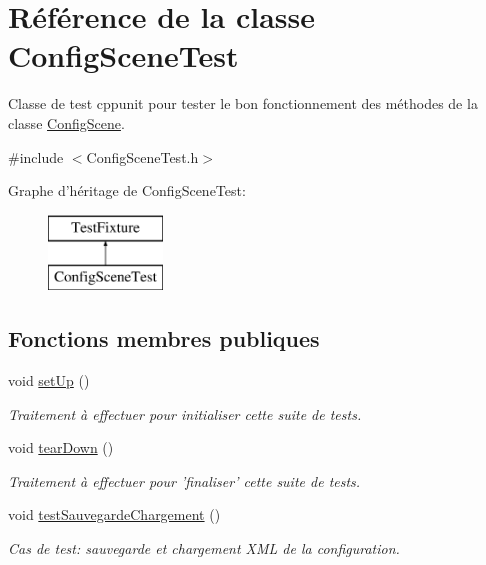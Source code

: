 \hypertarget{class_config_scene_test}{\section{Référence de la classe Config\-Scene\-Test}
\label{class_config_scene_test}
}


Classe de test cppunit pour tester le bon fonctionnement des méthodes de la classe \hyperlink{class_config_scene}{Config\-Scene}.  




{\ttfamily \#include $<$Config\-Scene\-Test.\-h$>$}

Graphe d'héritage de Config\-Scene\-Test\-:\begin{figure}[H]
\begin{center}
\leavevmode
\includegraphics[height=2.000000cm]{class_config_scene_test}
\end{center}
\end{figure}
\subsection*{Fonctions membres publiques}
\begin{DoxyCompactItemize}
\item 
void \hyperlink{group__inf2990_ga707d7400843047e67b736ab79bafb5a0}{set\-Up} ()
\begin{DoxyCompactList}\small\item\em Traitement à effectuer pour initialiser cette suite de tests. \end{DoxyCompactList}\item 
void \hyperlink{group__inf2990_ga889ed3891c3e55280cabb982953906d9}{tear\-Down} ()
\begin{DoxyCompactList}\small\item\em Traitement à effectuer pour 'finaliser' cette suite de tests. \end{DoxyCompactList}\item 
void \hyperlink{group__inf2990_ga0f09d52bc30d87f18b0341e1052efb74}{test\-Sauvegarde\-Chargement} ()
\begin{DoxyCompactList}\small\item\em Cas de test\-: sauvegarde et chargement X\-M\-L de la configuration. \end{DoxyCompactList}\end{DoxyCompactItemize}


